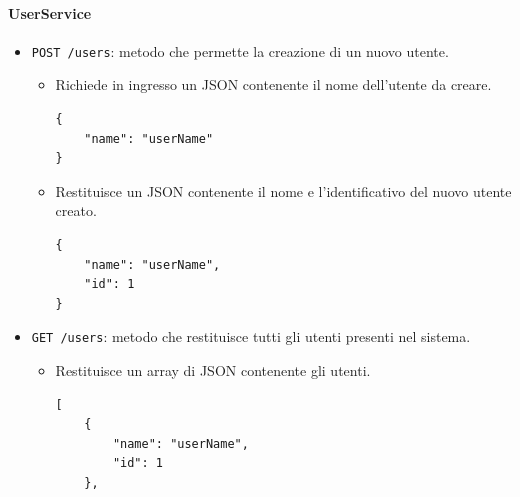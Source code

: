 \documentclass[a4paper]{article}
\begin{document}
\paragraph{UserService}
\begin{itemize}
    \item \texttt{POST /users}: metodo che permette la creazione di un nuovo utente.
    \begin{itemize}
        \item Richiede in ingresso un JSON contenente il nome dell'utente da creare.
        \begin{verbatim}
{
    "name": "userName"
}
        \end{verbatim}
        \item Restituisce un JSON contenente il nome e l'identificativo del nuovo utente creato.
        \begin{verbatim}
{
    "name": "userName",
    "id": 1
}
        \end{verbatim}
    \end{itemize} 
    \item \texttt{GET /users}: metodo che restituisce tutti gli utenti presenti nel sistema.
    \begin{itemize}
        \item Restituisce un array di JSON contenente gli utenti.
        \begin{verbatim}
[
    {
        "name": "userName",
        "id": 1
    },
    

\end{verbatim}
\end{itemize}
\end{itemize}
\end{document}
